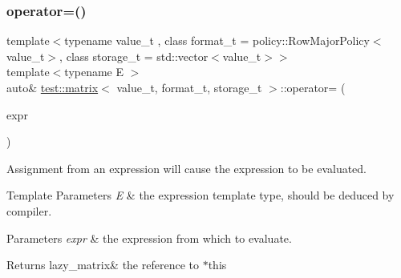 \subsubsection{\texorpdfstring{operator=()}{operator=()}\hspace{0.1cm}{\footnotesize\ttfamily [2/4]}}
{\footnotesize\ttfamily template$<$typename value\+\_\+t , class format\+\_\+t  = policy\+::\+Row\+Major\+Policy$<$value\+\_\+t$>$, class storage\+\_\+t  = std\+::vector$<$value\+\_\+t$>$$>$ \\
template$<$typename E $>$ \\
auto\& \mbox{\hyperlink{classtest_1_1matrix}{test\+::matrix}}$<$ value\+\_\+t, format\+\_\+t, storage\+\_\+t $>$\+::operator= (\begin{DoxyParamCaption}\item[{\mbox{\hyperlink{classtest_1_1expression}{expression}}$<$ E $>$ const \&}]{expr }\end{DoxyParamCaption})\hspace{0.3cm}{\ttfamily [inline]}}



Assignment from an expression will cause the expression to be evaluated. 


\begin{DoxyTemplParams}{Template Parameters}
{\em E} & the expression template type, should be deduced by compiler. \\
\hline
\end{DoxyTemplParams}

\begin{DoxyParams}{Parameters}
{\em expr} & the expression from which to evaluate. \\
\hline
\end{DoxyParams}
\begin{DoxyReturn}{Returns}
lazy\+\_\+matrix\& the reference to $\ast$this 
\end{DoxyReturn}
\mbox{\label{classtest_1_1matrix_ad0cf3573578dc69c13400be5c158c1fc}} 
